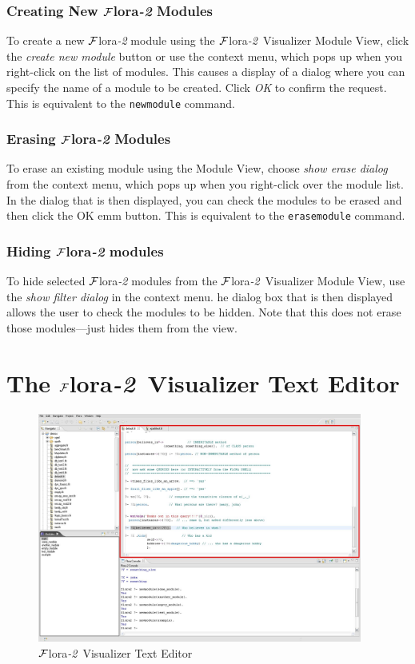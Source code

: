 \documentclass[a4paper,11pt]{article}
\newcommand{\FLORA}{{\mbox{\sc ${\cal F}${lora}\rm\emph{-2}}}\xspace}
\newcommand{\FVIZ}{{\mbox{\sc ${\cal F}${lora}\rm\emph{-2} {Visualizer}}}\xspace}
\begin{document}
\subsubsection{Creating New \FLORA Modules}
\label{sec:moduleview_usage_createmodules}

To create a new \FLORA module using the \FVIZ Module View,
click the \emph{create new module} button or use the context menu, which
pops up when you 
right-click on the list of modules.
This causes a display of a dialog where you can specify  the name of a
module to be created.
Click \emph{OK} to confirm the request.
This is equivalent to the {\tt newmodule} command. 

\subsubsection{Erasing \FLORA Modules}
\label{sec:moduleview_usage_erasemodules}

To erase an existing module using the Module View, choose
\emph{show erase dialog} from the context menu, which pops up when you
right-click over the module list. In the dialog that is then displayed, you
can check the modules to be erased and then click the OK emm button.
This is equivalent to the {\tt erasemodule} command. 


\subsubsection{Hiding  \FLORA modules}
\label{sec:moduleview_usage_filtermodules}

To hide selected \FLORA modules from the \FVIZ Module View, use
the \emph{show filter dialog} in the context menu.
he dialog box that is then displayed allows the user to check the modules
to be hidden. Note that this does not erase those modules---just hides them
from the view.

\section{The \FVIZ Text Editor}
\label{sec:texteditor}

\begin{figure}[tbh]
	\centering
		\includegraphics[width=0.95\textwidth]{fviz_editor}
	\caption{\FVIZ Text Editor}
	\label{fig:fviz_editor}
\end{figure}
\end{document}

